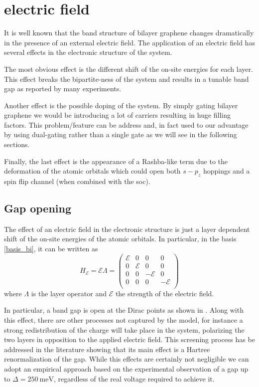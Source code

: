 \section{electric field}
It is well known that the band structure of bilayer graphene changes dramatically in the presence of an external electric field\cite{McCann2006, Castro2007, Oostinga2007, Zhang2009, Taychatanapat2010, Castro2010a, Ponomarenko2011, Allen2012, Sui2015}.
The application of an electric field has several effects in the electronic structure of the system.

The most obvious effect is the different shift of the on-site energies for each layer. This effect breaks the bipartite-ness of the system and results in a tunable band gap as reported by many experiments.

Another effect is the possible doping of the system. By simply gating bilayer graphene we would be introducing a lot of carriers resulting in huge filling factors. This problem/feature can be address and, in fact used to our advantage by using dual-gating rather than a single gate as we will see in the following sections.

Finally, the last effect is the appearance of a Rashba-like term due to the deformation of the atomic orbitals which could open both $s-p_z$ hoppings and a spin flip channel (when combined with the \ac{soc}).


\subsection{Gap opening}
The effect of an electric field in the electronic structure is just a layer dependent shift of the on-site energies of the atomic orbitals. In particular, in the basis \eqref{basis_bi}, it can be written as
\begin{equation}
   H_\mathcal{E} = \mathcal{E}\Lambda = \left(
   \begin{array}{cc|cc}
     \mathcal{E} & 0 & 0 & 0\\
     0 & \mathcal{E} & 0 & 0\\ \hline
     0 & 0 & -\mathcal{E} & 0\\
     0 & 0 & 0 & -\mathcal{E}\\
   \end{array}\right)
\label{Helec}
\end{equation}
where $\Lambda$ is the layer operator and $\mathcal{E}$ the strength of the electric field.

In particular, a band gap is open at the Dirac points as shown in . Along with this effect, there are other processes not captured by the model, for instance a strong redistribution of the charge will take place in the system, polarizing the two layers in opposition to the applied electric field. This screening process has be addressed in the literature showing that its main effect is a Hartree renormalization of the gap\cite{McCann2006,Wang2016a}. While this effects are certainly not negligible we can adopt an empirical approach based on the experimental observation\cite{Zhang2009, Taychatanapat2010} of a gap up to $\Delta=\SI{250}{\meV}$, regardless of the real voltage required to achieve it.



